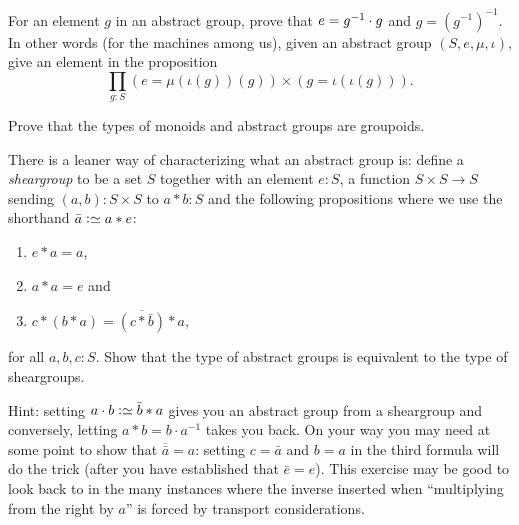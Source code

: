   \begin{xca}
    For an element $g$ in an abstract group, prove that
    $e=g^{-1}\cdot g$ and $g=(g^{-1})^{-1}$. In other words (for the
    machines among us), given an abstract group $(S,e,\mu,\iota)$,
    give an element in the proposition
    \begin{displaymath}
      \prod_{g:S} (e=\mu(\iota(g))(g))\times
      (g=\iota(\iota(g))).
    \end{displaymath}
  \end{xca}
  \begin{xca}\label{xca:typemonoidisgroupoid}
    Prove that the types of monoids and abstract groups are groupoids.
  \end{xca}
  \begin{xca}
    \label{xca:cheapgroup}
    There is a leaner way of characterizing what an abstract group is: define a \emph{sheargroup} to be a set $S$ together with an element $e:S$, a function $S\times S\to S$ sending $(a,b):S\times S$ to $a*b:S$ and the following propositions where we use the shorthand $\bar a\defequi a*e$:
    \begin{enumerate}
    \item $e*a=a$,
    \item $a*a=e$ and
    \item $c*(b*a)=\overline{(c*\bar b)}*a$,
    \end{enumerate}
    for all $a,b,c:S$.
    Show that the type of abstract groups is equivalent to the type of sheargroups.

Hint: setting $a\cdot b\defequi \bar b*a$ gives you an abstract group from a sheargroup and conversely, letting $a*b=b\cdot a^{-1}$ takes you back.  On your way you may need at some point to show that $\overline{\bar a}=a$: setting $c=\bar a$ and $b=a$ in the third formula will do the trick (after you have established that $\bar e=e$).  This exercise may be good to look back to in the many instances where the inverse inserted when ``multiplying from the right by $a$'' is forced by transport considerations.
\end{xca}
